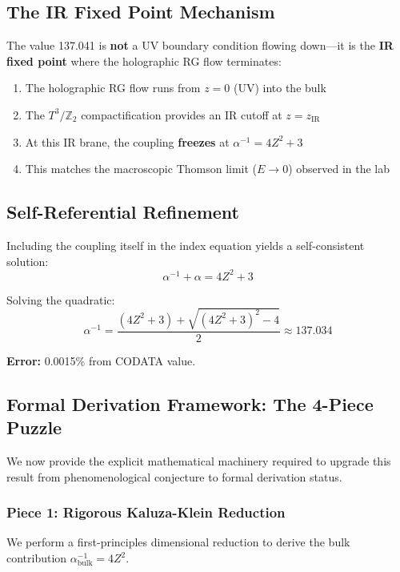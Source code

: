 \documentclass[12pt,a4paper]{article}
\newcommand{\Ztwo}{\mathbb{Z}_2}
\newcommand{\Zsq}{Z^2}
\begin{document}
\subsection{The IR Fixed Point Mechanism}

The value 137.041 is \textbf{not} a UV boundary condition flowing down---it is the \textbf{IR fixed point} where the holographic RG flow terminates:
\begin{enumerate}
    \item The holographic RG flow runs from $z = 0$ (UV) into the bulk
    \item The $T^3/\Ztwo$ compactification provides an IR cutoff at $z = z_{\text{IR}}$
    \item At this IR brane, the coupling \textbf{freezes} at $\alpha^{-1} = 4\Zsq + 3$
    \item This matches the macroscopic Thomson limit ($E \to 0$) observed in the lab
\end{enumerate}

\subsection{Self-Referential Refinement}

Including the coupling itself in the index equation yields a self-consistent solution:
\begin{equation}
\alpha^{-1} + \alpha = 4\Zsq + 3
\end{equation}

Solving the quadratic:
\begin{equation}
\alpha^{-1} = \frac{(4\Zsq + 3) + \sqrt{(4\Zsq + 3)^2 - 4}}{2} \approx 137.034
\end{equation}

\textbf{Error:} 0.0015\% from CODATA value.

\subsection{Formal Derivation Framework: The 4-Piece Puzzle}

We now provide the explicit mathematical machinery required to upgrade this result from phenomenological conjecture to formal derivation status.

\subsubsection{Piece 1: Rigorous Kaluza-Klein Reduction}

We perform a first-principles dimensional reduction to derive the bulk contribution $\alpha_{\text{bulk}}^{-1} = 4\Zsq$.
\end{document}
